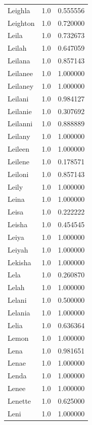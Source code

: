 \documentclass[
  letterpaper,
  DIV=11,
  numbers=noendperiod]{scrreprt}
\begin{document}
\begin{tabular}{lrr}
Leighla         &   1.0 &   0.555556 \\
Leighton        &   1.0 &   0.720000 \\
Leila           &   1.0 &   0.732673 \\
Leilah          &   1.0 &   0.647059 \\
Leilana         &   1.0 &   0.857143 \\
Leilanee        &   1.0 &   1.000000 \\
Leilaney        &   1.0 &   1.000000 \\
Leilani         &   1.0 &   0.984127 \\
Leilanie        &   1.0 &   0.307692 \\
Leilanni        &   1.0 &   0.888889 \\
Leilany         &   1.0 &   1.000000 \\
Leileen         &   1.0 &   1.000000 \\
Leilene         &   1.0 &   0.178571 \\
Leiloni         &   1.0 &   0.857143 \\
Leily           &   1.0 &   1.000000 \\
Leina           &   1.0 &   1.000000 \\
Leisa           &   1.0 &   0.222222 \\
Leisha          &   1.0 &   0.454545 \\
Leiya           &   1.0 &   1.000000 \\
Leiyah          &   1.0 &   1.000000 \\
Lekisha         &   1.0 &   1.000000 \\
Lela            &   1.0 &   0.260870 \\
Lelah           &   1.0 &   1.000000 \\
Lelani          &   1.0 &   0.500000 \\
Lelania         &   1.0 &   1.000000 \\
Lelia           &   1.0 &   0.636364 \\
Lemon           &   1.0 &   1.000000 \\
Lena            &   1.0 &   0.981651 \\
Lenae           &   1.0 &   1.000000 \\
Lenda           &   1.0 &   1.000000 \\
Lenee           &   1.0 &   1.000000 \\
Lenette         &   1.0 &   0.625000 \\
Leni            &   1.0 &   1.000000 \\

\end{tabular}
\end{document}
